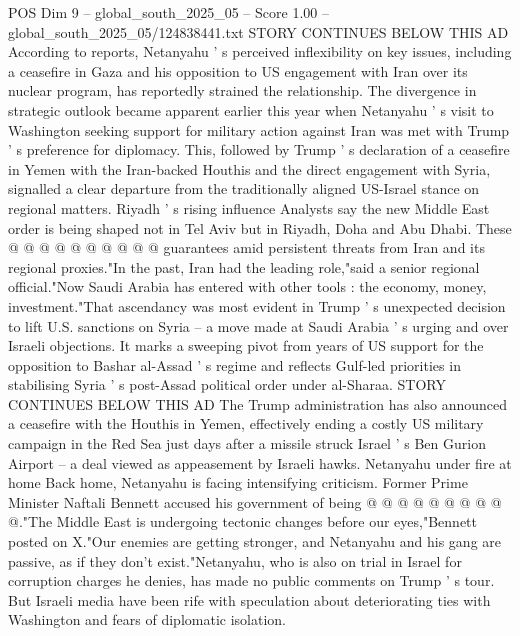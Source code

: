 \begin{textsample}{POS Dim 9 – global\_south\_2025\_05 – Score 1.00 – global\_south\_2025\_05/124838441.txt}
STORY CONTINUES BELOW THIS AD According to reports, Netanyahu ' s perceived inflexibility on key issues, including a ceasefire in Gaza and his opposition to US engagement with Iran over its nuclear program, has reportedly strained the relationship.
The divergence in strategic outlook became apparent earlier this year when Netanyahu ' s visit to Washington seeking support for military action against Iran was met with Trump ' s preference for diplomacy.
This, followed by Trump ' s declaration of a ceasefire in Yemen with the Iran-backed Houthis and the direct engagement with Syria, signalled a clear departure from the traditionally aligned US-Israel stance on regional matters.
Riyadh ' s rising influence Analysts say the new Middle East order is being shaped not in Tel Aviv but in Riyadh, Doha and Abu Dhabi.
These @ @ @ @ @ @ @ @ @ @ guarantees amid persistent threats from Iran and its regional proxies."In the past, Iran had the leading role,"said a senior regional official."Now Saudi Arabia has entered with other tools : the economy, money, investment."That ascendancy was most evident in Trump ' s unexpected decision to lift U.S. sanctions on Syria -- a move made at Saudi Arabia ' s urging and over Israeli objections.
It marks a sweeping pivot from years of US support for the opposition to Bashar al-Assad ' s regime and reflects Gulf-led priorities in stabilising Syria ' s post-Assad political order under al-Sharaa.
STORY CONTINUES BELOW THIS AD The Trump administration has also announced a ceasefire with the Houthis in Yemen, effectively ending a costly US military campaign in the Red Sea just days after a missile struck Israel ' s Ben Gurion Airport -- a deal viewed as appeasement by Israeli hawks.
Netanyahu under fire at home Back home, Netanyahu is facing intensifying criticism.
Former Prime Minister Naftali Bennett accused his government of being @ @ @ @ @ @ @ @ @ @."The Middle East is undergoing tectonic changes before our eyes,"Bennett posted on X."Our enemies are getting stronger, and Netanyahu and his gang are passive, as if they don't exist."Netanyahu, who is also on trial in Israel for corruption charges he denies, has made no public comments on Trump ' s tour.
But Israeli media have been rife with speculation about deteriorating ties with Washington and fears of diplomatic isolation.

\end{textsample}

